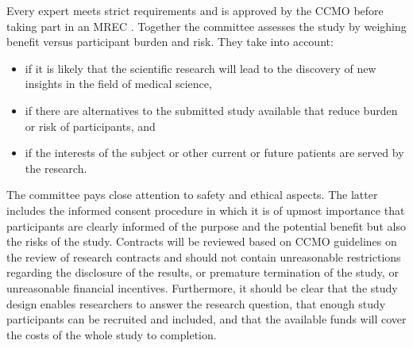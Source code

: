 \documentclass[authordate, meta]{jote-new-article}
\begin{document}
Every expert meets strict requirements and is approved by the CCMO before taking part in an MREC \parencites{CCMO2020}. Together the committee assesses the study by weighing benefit versus participant burden and risk. They take into account:


\begin{itemize}


  \item if it is likely that the scientific research will lead to the discovery of new insights in the field of medical science,



  \item
        if there are alternatives to the submitted study available that reduce burden or risk of participants, and



  \item if the interests of the subject or other current or future patients are served by the research.


\end{itemize}

The committee pays close attention to safety and ethical aspects. The latter includes the informed consent procedure in which it is of upmost importance that participants are clearly informed of the purpose and the potential benefit but also the risks of the study. Contracts will be reviewed based on CCMO guidelines on the review of research contracts \parencites{CCMO2011} and should not contain unreasonable restrictions regarding the disclosure of the results, or premature termination of the study, or unreasonable financial incentives. Furthermore, it should be clear that the study design enables researchers to answer the research question, that enough study participants can be recruited and included, and that the available funds will cover the costs of the whole study to completion.
\end{document}
